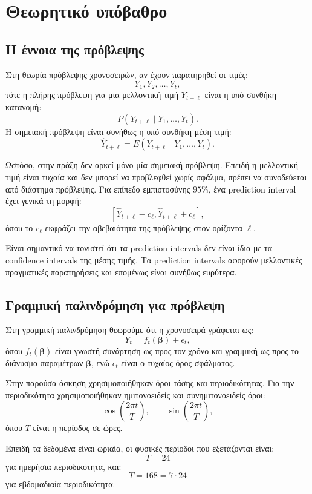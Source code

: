 \documentclass{article}
\begin{document}
\section{Θεωρητικό υπόβαθρο}

\subsection{Η έννοια της πρόβλεψης}

Στη θεωρία πρόβλεψης χρονοσειρών, αν έχουν παρατηρηθεί οι τιμές:
\[
Y_1,Y_2,\ldots,Y_t,
\]
τότε η πλήρης πρόβλεψη για μια μελλοντική τιμή $Y_{t+\ell}$ είναι η υπό συνθήκη κατανομή:
\[
P(Y_{t+\ell} \mid Y_1,\ldots,Y_t).
\]
Η σημειακή πρόβλεψη είναι συνήθως η υπό συνθήκη μέση τιμή:
\[
\hat{Y}_{t+\ell} = E(Y_{t+\ell} \mid Y_1,\ldots,Y_t).
\]

Ωστόσο, στην πράξη δεν αρκεί μόνο μία σημειακή πρόβλεψη. Επειδή η μελλοντική τιμή είναι τυχαία και δεν μπορεί να προβλεφθεί χωρίς σφάλμα, πρέπει να συνοδεύεται από διάστημα πρόβλεψης. Για επίπεδο εμπιστοσύνης $95\%$, ένα prediction interval έχει γενικά τη μορφή:
\[
[\hat{Y}_{t+\ell} - c_{\ell},\hat{Y}_{t+\ell} + c_{\ell}],
\]
όπου το $c_{\ell}$ εκφράζει την αβεβαιότητα της πρόβλεψης στον ορίζοντα $\ell$.

Είναι σημαντικό να τονιστεί ότι τα prediction intervals δεν είναι ίδια με τα confidence intervals της μέσης τιμής. Τα prediction intervals αφορούν μελλοντικές πραγματικές παρατηρήσεις και επομένως είναι συνήθως ευρύτερα.

\subsection{Γραμμική παλινδρόμηση για πρόβλεψη}

Στη γραμμική παλινδρόμηση θεωρούμε ότι η χρονοσειρά γράφεται ως:
\[
Y_t = f_t(\boldsymbol{\beta}) + \epsilon_t,
\]
όπου $f_t(\boldsymbol{\beta})$ είναι γνωστή συνάρτηση ως προς τον χρόνο και γραμμική ως προς το διάνυσμα παραμέτρων $\boldsymbol{\beta}$, ενώ $\epsilon_t$ είναι ο τυχαίος όρος σφάλματος.

Στην παρούσα άσκηση χρησιμοποιήθηκαν όροι τάσης και περιοδικότητας. Για την περιοδικότητα χρησιμοποιήθηκαν ημιτονοειδείς και συνημιτονοειδείς όροι:
\[
\cos\left(\frac{2\pi t}{T}\right), \qquad
\sin\left(\frac{2\pi t}{T}\right),
\]
όπου $T$ είναι η περίοδος σε ώρες.

Επειδή τα δεδομένα είναι ωριαία, οι φυσικές περίοδοι που εξετάζονται είναι:
\[
T=24
\]
για ημερήσια περιοδικότητα, και:
\[
T=168 = 7 \cdot 24
\]
για εβδομαδιαία περιοδικότητα.
\end{document}

